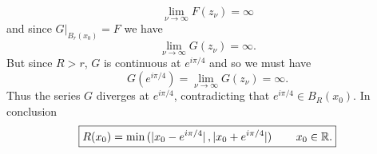 \begin{enumerate}[label = \textbf{Exercise \arabic*.},wide = 0pt, itemsep=1.5ex]
		\begin{equation}
			\lim_{\nu \to \infty}F(z_\nu) = \infty
		\end{equation}
		\noindent and since $G\vert_{B_r(x_0)} = F$ we have
		\begin{equation}
			\lim_{\nu \to \infty} G(z_\nu) = \infty.	
		\end{equation}
		\noindent But since $R > r$, $G$ is continuous at $e^{i\pi/4}$ and so we must have
		\begin{equation}
			G(e^{i\pi/4}) = \lim_{\nu \to \infty}G(z_\nu) = \infty.
		\end{equation}
		Thus the series $G$ diverges at $e^{i\pi/4}$, contradicting that $e^{i\pi/4} \in B_R(x_0)$. In conclusion 
		\begin{equation}
			\boxed{R(x_0) = \min\del[0]{\abs[0]{x_0 - e^{i\pi/4}},\abs[0]{x_0 + e^{i\pi/4}}} \qquad x_0 \in \mathbb{R}.}
		\end{equation}


\end{enumerate}
